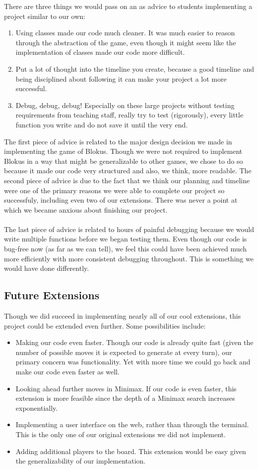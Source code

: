 \documentclass[11pt]{article}
\begin{document}
There are three things we would pass on an as advice to students implementing a project similar to our own:
\begin{enumerate}
	\item Using classes made our code much cleaner. It was much easier to reason through the abstraction of the game, even though it might seem like the implementation of classes made our code more difficult.
	\item Put a lot of thought into the timeline you create, because a good timeline and being disciplined about following it can make your project a lot more successful.
	\item Debug, debug, debug! Especially on these large projects without testing requirements from teaching staff, really try to test (rigorously), every little function you write and do not save it until the very end.
\end{enumerate}
The first piece of advice is related to the major design decision we made in implementing the game of Blokus. Though we were not required to implement Blokus in a way that might be generalizable to other games, we chose to do so because it made our code very structured and also, we think, more readable. The second piece of advice is due to the fact that we think our planning and timeline were one of the primary reasons we were able to complete our project so successfuly, including even two of our extensions. There was never a point at which we became anxious about finishing our project.
\\\\
The last piece of advice is related to hours of painful debugging because we would write multiple functions before we began testing them. Even though our code is bug-free now (as far as we can tell), we feel this could have been achieved much more efficiently with more consistent debugging throughout. This is something we would have done differently.

\subsection{Future Extensions}

Though we did succeed in implementing nearly all of our cool extensions, this project could be extended even further. Some possibilities include:
\begin{itemize}
	\item Making our code even faster. Though our code is already quite fast (given the number of possible moves it is expected to generate at every turn), our primary concern was functionality. Yet with more time we could go back and make our code even faster as well.
	\item Looking ahead further moves in Minimax. If our code is even faster, this extension is more feasible since the depth of a Minimax search increases exponentially.
	\item Implementing a user interface on the web, rather than through the terminal. This is the only one of our original extensions we did not implement.
	\item Adding additional players to the board. This extension would be easy given the generalizability of our implementation.
\end{itemize}
\end{document}
